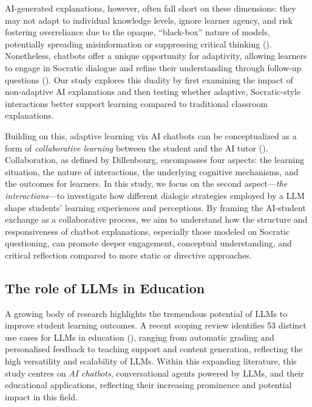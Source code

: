 \documentclass[
  11pt,
]{article}
\begin{document}
AI-generated explanations, however, often fall short on these dimensions: they may not adapt to individual knowledge levels, ignore learner agency, and risk fostering overreliance due to the opaque, ``black-box'' nature of models, potentially spreading misinformation or suppressing critical thinking (). Nonetheless, chatbots offer a unique opportunity for adaptivity, allowing learners to engage in Socratic dialogue and refine their understanding through follow-up questions (). Our study explores this duality by first examining the impact of non-adaptive AI explanations and then testing whether adaptive, Socratic-style interactions better support learning compared to traditional classroom explanations.

Building on this, adaptive learning via AI chatbots can be conceptualized as a form of \emph{collaborative learning} between the student and the AI tutor (). Collaboration, as defined by Dillenbourg, encompasses four aspects: the learning situation, the nature of interactions, the underlying cognitive mechanisms, and the outcomes for learners. In this study, we focus on the second aspect---\emph{the interactions}---to investigate how different dialogic strategies employed by a LLM shape students' learning experiences and perceptions. By framing the AI-student exchange as a collaborative process, we aim to understand how the structure and responsiveness of chatbot explanations, especially those modeled on Socratic questioning, can promote deeper engagement, conceptual understanding, and critical reflection compared to more static or directive approaches.

\subsection{The role of LLMs in Education}\label{the-role-of-llms-in-education}

A growing body of research highlights the tremendous potential of LLMs to improve student learning outcomes. A recent scoping review identifies 53 distinct use cases for LLMs in education (), ranging from automatic grading and personalised feedback to teaching support and content generation, reflecting the high versatility and scalability of LLMs. Within this expanding literature, this study centres on \emph{AI chatbots}, conversational agents powered by LLMs, and their educational applications, reflecting their increasing prominence and potential impact in this field.
\end{document}
